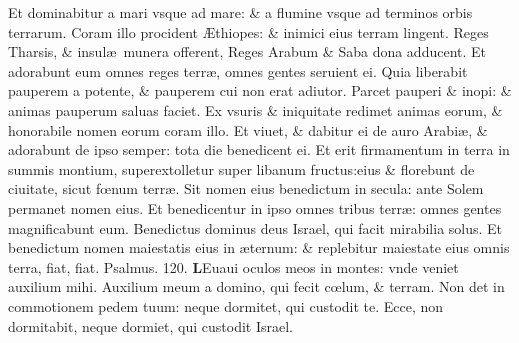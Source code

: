 \documentclass[a5paper,10pt]{book}
\def\ae{æ}
\def\AE{Æ}
\def\oe{œ}
\begin{document}
\begin{multicols*}{2}
\newline \color{red} E\color{black}t dominabitur a mari vsque ad mare: \& a flumine vsque ad terminos orbis terrarum.
\newline \color{red} C\color{black}oram illo procident \AE thiopes: \& inimici eius terram lingent.
\newline \color{red} R\color{black}eges Tharsis, \& insul\ae \ munera offerent, Reges Arabum \& Saba dona adducent.
\newline \color{red} E\color{black}t adorabunt eum omnes reges terr\ae , omnes gentes seruient ei.
\newline \color{red} Q\color{black}uia liberabit pauperem a potente, \& pauperem cui non erat adiutor.
\newline \color{red} P\color{black}arcet pauperi \& inopi: \& animas pauperum saluas faciet.
\newline \color{red} E\color{black}x vsuris \& iniquitate redimet animas eorum, \& honorabile nomen eorum coram illo.
\newline \color{red} E\color{black}t viuet, \& dabitur ei de auro Arabi\ae , \& adorabunt de ipso semper: tota die benedicent ei.
\newline \color{red} E\color{black}t erit firmamentum in terra in summis montium, superextolletur super libanum fructus:eius \& florebunt de ciuitate, sicut f\oe num terr\ae .
\newline \color{red} S\color{black}it nomen eius benedictum in secula: ante Solem permanet nomen eius.
\newline \color{red} E\color{black}t benedicentur in ipso omnes tribus terr\ae : omnes gentes magnificabunt eum.
\newline \color{red} B\color{black}enedictus dominus deus Israel, qui facit mirabilia solus.
\newline \color{red} E\color{black}t benedictum nomen maiestatis eius in \ae ternum: \& replebitur maiestate eius omnis terra, fiat, fiat.
\newline \color{red} Psalmus. 120. \color{black}
\vspace{-1em}
\lettrine[lines=2]{\bfseries \color{red} L}{}Euaui oculos meos in montes: vnde veniet auxilium mihi.
\newline \color{red} A\color{black}uxilium meum a domino, qui fecit c\oe lum, \& terram.
\newline \color{red} N\color{black}on det in commotionem pedem tuum: neque dormitet, qui custodit te.
\newline \color{red} E\color{black}cce, non dormitabit, neque dormiet, qui custodit Israel.

\end{multicols*}
\end{document}
